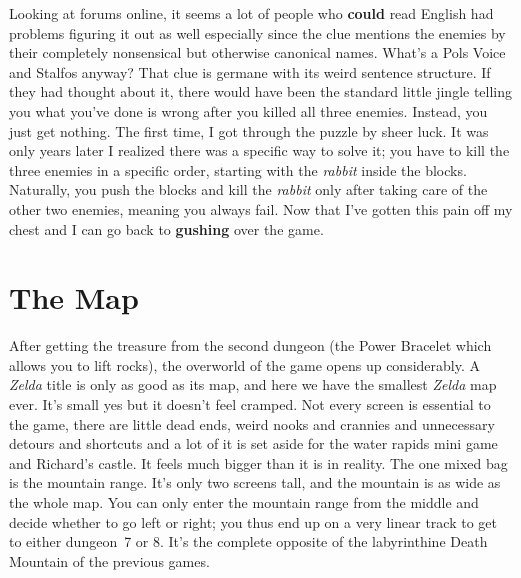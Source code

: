 \documentclass{book}
\begin{document}
\FloatBarrier\vspace{\baselineskip}\begin{figure}[H]\end{figure}
Looking at forums online, it seems a lot of people who \textbf{could} read English had problems figuring it out as well especially since the clue mentions the enemies by their completely nonsensical but otherwise canonical names. What’s a Pols Voice and Stalfos anyway? That clue is germane with its weird sentence structure. If they had thought about it, there would have been the standard little jingle telling you what you’ve done is wrong after you killed all three enemies. Instead, you just get nothing. The first time, I got through the puzzle by sheer luck. It was only years later I realized there was a specific way to solve it; you have to kill the three enemies in a specific order, starting with the \emph{rabbit} inside the blocks. Naturally, you push the blocks and kill the \emph{rabbit} only after taking care of the other two enemies, meaning you always fail. Now that I’ve gotten this pain off my chest and I can go back to \textbf{gushing} over the game.\par
\FloatBarrier\vspace{\baselineskip}\begin{figure}[H]\end{figure}
\FloatBarrier\section*{The Map}
After getting the treasure from the second dungeon (the Power Bracelet which allows you to lift rocks), the overworld of the game opens up considerably. A \emph{Zelda} title is only as good as its map, and here we have the smallest \emph{Zelda} map ever. It’s small yes but it doesn’t feel cramped. Not every screen is essential to the game, there are little dead ends, weird nooks and crannies and unnecessary detours and shortcuts and a lot of it is set aside for the water rapids mini game and Richard’s castle. It feels much bigger than it is in reality. The one mixed bag is the mountain range. It’s only two screens tall, and the mountain is as wide as the whole map. You can only enter the mountain range from the middle and decide whether to go left or right; you thus end up on a very linear track to get to either dungeon~7 or 8. It’s the complete opposite of the labyrinthine Death Mountain of the previous games.\par
\end{document}
